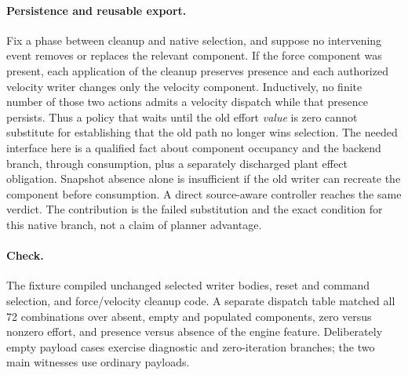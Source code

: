 \documentclass{article}
\begin{document}
\paragraph{Persistence and reusable export.}
Fix a phase between cleanup and native selection, and suppose no
intervening event removes or replaces the relevant component. If the
force component was present, each application of the cleanup preserves
presence and each authorized velocity writer changes only the velocity
component. Inductively, no finite number of those two actions admits
a velocity dispatch while that presence persists. Thus a policy that
waits until the old effort \emph{value} is zero cannot substitute for
establishing that the old path no longer wins selection. The needed
interface here is a qualified fact about component occupancy and
the backend branch, through consumption, plus a separately discharged
plant effect obligation. Snapshot absence alone is insufficient if the
old writer can recreate the component before consumption. A direct
source-aware controller reaches the same verdict. The contribution is
the failed substitution and the exact condition for this native branch,
not a claim of planner advantage.

\paragraph{Check.}
The fixture compiled unchanged selected writer bodies, reset and command
selection, and force/velocity cleanup code. A separate dispatch table
matched all 72 combinations over absent, empty and populated components,
zero versus nonzero effort, and presence versus absence of the engine
feature. Deliberately empty payload cases exercise diagnostic and
zero-iteration branches; the two main witnesses use ordinary payloads.
\end{document}

